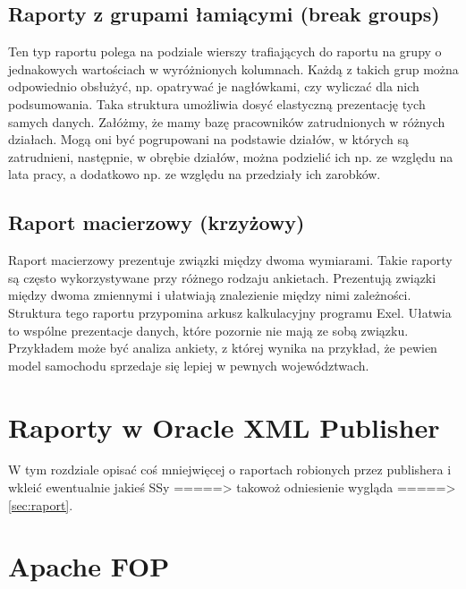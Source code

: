 \documentclass[11pt,a4paper]{article}
\begin{document}
\subsection{Raporty z grupami łamiącymi (break groups)}\label{sec:break_groups}
Ten typ raportu polega na podziale wierszy trafiających do raportu na grupy o jednakowych wartościach w wyróżnionych kolumnach. Każdą z takich grup można odpowiednio obsłużyć, np. opatrywać je nagłówkami, czy wyliczać dla nich podsumowania. Taka struktura umożliwia dosyć elastyczną prezentację tych samych danych. Załóżmy, że mamy bazę pracowników zatrudnionych w różnych działach. Mogą oni być pogrupowani na podstawie działów, w których są zatrudnieni, następnie, w obrębie działów, można podzielić ich np. ze względu na lata pracy, a dodatkowo np. ze względu na przedziały ich zarobków. 
\subsection{Raport macierzowy (krzyżowy)}\label{sec:macierzowy}
Raport macierzowy prezentuje związki między dwoma wymiarami. Takie raporty są często wykorzystywane przy różnego rodzaju ankietach. Prezentują związki między dwoma zmiennymi i ułatwiają znalezienie między nimi zależności. Struktura tego raportu przypomina arkusz kalkulacyjny programu Exel. Ułatwia to wspólne prezentacje danych, które pozornie nie mają ze sobą związku. Przykładem może być analiza ankiety, z której wynika na przykład, że pewien model samochodu sprzedaje się lepiej w pewnych województwach.
\section{Raporty w Oracle XML Publisher}\label{sec:raportOraclePublisher}
W tym rozdziale opisać coś mniejwięcej o raportach robionych przez publishera i wkleić ewentualnie jakieś SSy
=====> takowoż odniesienie wygląda =====>  \ref{sec:raport}.

\section{Apache FOP}\label{sec:fop}
 
\end{document}
